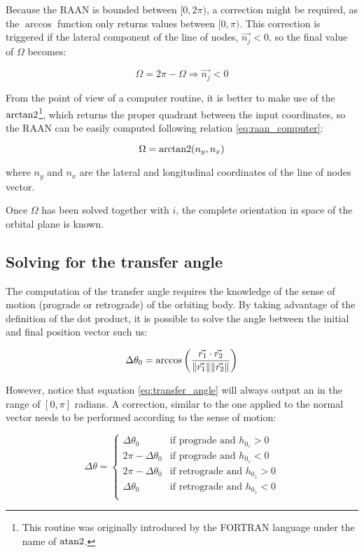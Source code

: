 Because the RAAN is bounded between $[0,2\pi)$, a correction might be required,
as the $\arccos$ function only returns values between $[0,\pi)$. This correction
is triggered if the lateral component of the line of nodes, $\vec{n_{j}} < 0$,
so the final value of $\Omega$ becomes:

\begin{equation}
  \Omega = 2\pi - \Omega \Rightarrow \vec{n_{j}} < 0
  \label{eq:raan_correction}
\end{equation}

From the point of view of a computer routine, it is better to make use of the
$\operatorname{arctan2}$\footnote{This routine was originally introduced by the FORTRAN
  language under the name of $\operatorname{atan2}$.}, which returns the proper quadrant
between the input coordinates, so the RAAN can be easily computed following
relation \ref{eq:raan_computer}:

\begin{equation}
  \Omega = \operatorname{arctan2}(n_{y}, n_{x})
  \label{eq:raan_computer}
\end{equation}

where $n_{y}$ and $n_{x}$ are the lateral and longitudinal coordinates of the
line of nodes vector.

Once $\Omega$ has been solved together with $i$, the complete orientation in
space of the orbital plane is known.

\subsection{Solving for the transfer angle}

The computation of the transfer angle requires the knowledge of the sense of
motion (prograde or retrograde) of the orbiting body. By taking advantage of the
definition of the dot product, it is possible to solve the angle between the
initial and final position vector such us:

\begin{equation}
  \Delta \theta_0 = \arccos{\left(\frac{\vec{r_1} \cdot \vec{r_2}}{\lVert\vec{r_1}\rVert \lVert\vec{r_2}\rVert}\right)}
  \label{eq:transfer_angle}
\end{equation}

However, notice that equation \ref{eq:transfer_angle} will always output an
in the range of $[0, \pi]$ radians. A correction, similar to the one applied to
the normal vector needs to be performed according to the sense of motion:


\begin{equation}
  \Delta \theta =
  \begin{cases}
    \Delta \theta_0         & \text{if prograde and $h_{0_{z}} > 0$}   \\
    2 \pi - \Delta \theta_0 & \text{if prograde and $h_{0_{z}} < 0$}   \\
    2 \pi - \Delta \theta_0 & \text{if retrograde and $h_{0_{z}} > 0$} \\
    \Delta \theta_0         & \text{if retrograde and $h_{0_{z}} < 0$} \\
  \end{cases}
\end{equation}


